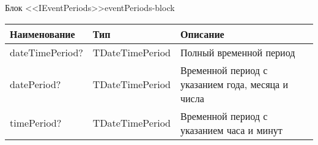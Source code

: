 \begin{tbl}{Блок <<IEventPeriods>>}{eventPeriods-block}
  \begin{tabularx}{\textwidth}{| p{3cm} | p{6cm} | X |}
  \hline Наименование    & Тип             & Описание                                          \\
  \hline dateTimePeriod? & TDateTimePeriod & Полный временной период                           \\
  \hline datePeriod?     & TDateTimePeriod & Временной период с указанием года, месяца и числа \\
  \hline timePeriod?     & TDateTimePeriod & Временной период с указанием часа и минут         \\
  \hline
  \end{tabularx}
\end{tbl}
